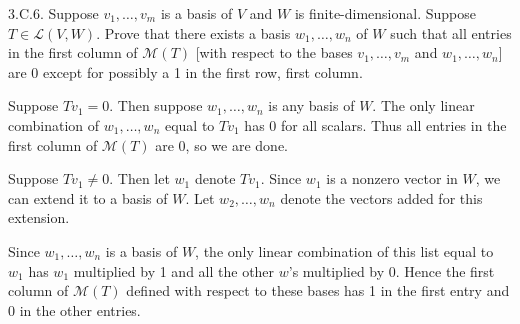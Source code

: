 \documentclass[a5paper]{article}
\begin{document}
\newcommand   \C           {\mathbf{C}}
\newcommand   \R           {\mathbf{R}}
\renewcommand \L           {\mathcal{L}}
\newcommand   \F           {\mathbf{F}}
\renewcommand \P           {\mathcal{P}}
\newcommand   \M           {\mathcal{M}}
\newcommand   \op          {\operatorname}

    3.C.6.
    Suppose $v_1,\dots,v_m$ is a basis of $V$ and $W$ is finite-dimensional.
    Suppose $T \in \L(V,W)$.
    Prove that there exists a basis $w_1,\dots,w_n$ of $W$ such that all entries in the first column of $\M(T)$ [with respect to the bases $v_1,\dots,v_m$ and $w_1,\dots,w_n$] are 0 except for possibly a 1 in the first row, first column.

    Suppose $Tv_1 = 0$.
    Then suppose $w_1,\dots,w_n$ is any basis of $W$.
    The only linear combination of $w_1,\dots,w_n$ equal to $Tv_1$ has 0 for all scalars.
    Thus all entries in the first column of $\M(T)$ are 0, so we are done.

    Suppose $Tv_1 \neq 0$.
    Then let $w_1$ denote $Tv_1$.
    Since $w_1$ is a nonzero vector in $W$, we can extend it to a basis of $W$.
    Let $w_2,\dots,w_n$ denote the vectors added for this extension.

    Since $w_1,\dots,w_n$ is a basis of $W$, the only linear combination of this list equal to $w_1$ has $w_1$ multiplied by 1 and all the other $w$'s multiplied by 0.
    Hence the first column of $\M(T)$ defined with respect to these bases has 1 in the first entry and 0 in the other entries.
\end{document}
